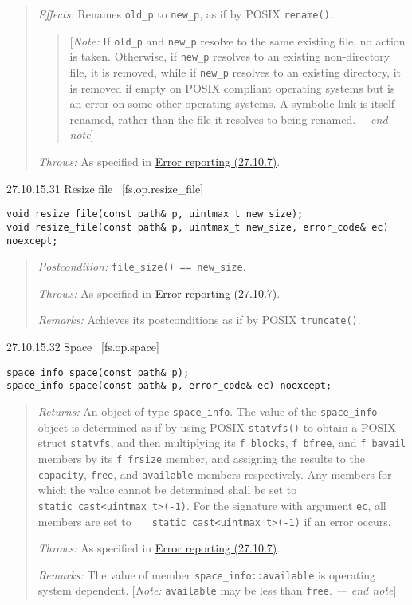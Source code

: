 \begin{quote}
\emph{Effects:} Renames \texttt{old\_p} to \texttt{new\_p}, as if by
POSIX \texttt{rename()}.

\begin{quote}
{[}\emph{Note:} If \texttt{old\_p} and \texttt{new\_p} resolve to the
same existing file, no action is taken. Otherwise, if \texttt{new\_p}
resolves to an existing non-directory file, it is removed, while if
\texttt{new\_p} resolves to an existing directory, it is removed if
empty on POSIX compliant operating systems but is an error on some other
operating systems. A symbolic link is itself renamed, rather than the
file it resolves to being renamed. \emph{---end note}{]}
\end{quote}

\emph{Throws:} As specified in \hyperref[Error-reporting]{Error
reporting (27.10.7)}.
\end{quote}

27.10.15.31 Resize file~ {[}fs.op.resize\_file{]}

\begin{verbatim}
void resize_file(const path& p, uintmax_t new_size);
void resize_file(const path& p, uintmax_t new_size, error_code& ec) noexcept;
\end{verbatim}

\begin{quote}
\emph{Postcondition:} \texttt{file\_size()\ ==\ new\_size}.

\emph{Throws:} As specified in \hyperref[Error-reporting]{Error
reporting (27.10.7)}.

\emph{Remarks:} Achieves its postconditions as if by POSIX
\texttt{truncate()}.
\end{quote}

27.10.15.32 Space~ {[}fs.op.space{]}

\begin{verbatim}
space_info space(const path& p);
space_info space(const path& p, error_code& ec) noexcept;
\end{verbatim}

\begin{quote}
\emph{Returns:} An object of type \texttt{space\_info}. The value of the
\texttt{space\_info} object is determined as if by using POSIX
\texttt{statvfs()} to obtain a POSIX struct \texttt{statvfs}, and then
multiplying its \texttt{f\_blocks}, \texttt{f\_bfree}, and
\texttt{f\_bavail} members by its \texttt{f\_frsize} member, and
assigning the results to the \texttt{capacity}, \texttt{free}, and
\texttt{available} members respectively. Any members for which the value
cannot be determined shall be set to
\texttt{static\_cast\textless{}uintmax\_t\textgreater{}(-1)}. For the
signature with argument \texttt{ec}, all members are set to
\texttt{\ \ \ static\_cast\textless{}uintmax\_t\textgreater{}(-1)} if an
error occurs.

\emph{Throws:} As specified in \hyperref[Error-reporting]{Error
reporting (27.10.7)}.

\emph{Remarks:} The value of member \texttt{space\_info::available} is
operating system dependent. {[}\emph{Note:} \texttt{available} may be
less than \texttt{free}. \emph{--- end note}{]}
\end{quote}

